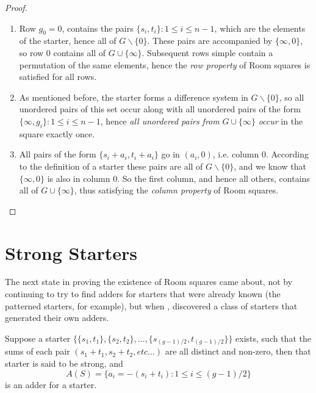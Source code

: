 \begin{proof}
\begin{enumerate}
  \item{Row $g_0 = 0$, contains the pairs
      $\{s_i, t_i\}:1 \leq i \leq n-1$,
      which are the elements of the starter,
      hence all of $G \backslash \{0\}$. These pairs are
      accompanied by $\{\infty, 0\}$, so row 0 contains all
      of $G \cup \{\infty\}$. Subsequent rows simple
      contain a permutation of the same elements, hence
      the \emph{row property} of Room squares is satisfied for
      all rows.}
  \item{As mentioned before, the starter forms a difference
      system in $G \backslash \{0\}$, so all unordered
      pairs of this set occur along with all unordered
      pairs of the form
      $\{\infty, g_i\}: 1 \leq i \leq n - 1$,
      hence \emph{all unordered pairs from}
      $G \cup \{\infty\}$ \emph{occur} in the square exactly once.}
  \item{All pairs of the form $\{s_i + a_i, t_i + a_i\}$ go in
      $(a_i, 0)$, i.e. column 0. According to the
      definition of a starter these pairs are all of $G
      \backslash \{0\}$, and we know that $\{\infty,0\}$
      is also in column 0. So the first column, and hence
      all others, contains all of $G \cup \{\infty\}$,
      thus satisfying the \emph{column property} of Room
      squares.}
\end{enumerate}
\end{proof}

\section{Strong Starters}

The next state in proving the existence of Room squares came about, not by continuing to try to find adders for starters that were already known (the patterned starters, for example), but when
\cite{mullinFurnishingRoomSquares1969},
discovered a class of starters that generated their own adders.

\begin{theorem}
\label{thm:furnishing}
Suppose a starter
$\{\{s_1, t_1\}, \{s_2, t_2\}, \ldots, \{s_{(g - 1)/2}, t_{(g - 1)/2}\}\}$
exists, such that the sums of each pair
$(s_1 + t_1, s_2 + t_2, etc...)$
are all distinct and non-zero, then that starter is said to be strong, and
\begin{equation}
 A(S) = \{a_i = -(s_i + t_i):1 \leq i \leq (g - 1)/2\}
\end{equation}
is an adder for a starter.
\end{theorem}

